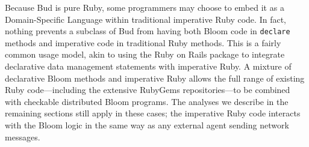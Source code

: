 Because Bud is pure Ruby, some programmers may choose to embed it as a
Domain-Specific Language within traditional imperative Ruby code.  In fact,
nothing prevents a subclass of Bud from having both Bloom code in
\texttt{declare} methods and imperative code in traditional Ruby methods.  This
is a fairly common usage model, akin to using the Ruby on Rails package to
integrate declarative data management statements with imperative Ruby. A mixture
of declarative Bloom methods and imperative Ruby allows the full range of
existing Ruby code---including the extensive RubyGems repositories---to be
combined with checkable distributed Bloom programs. The analyses we describe in
the remaining sections still apply in these cases; the imperative Ruby code
interacts with the Bloom logic in the same way as any external agent sending
network messages.
